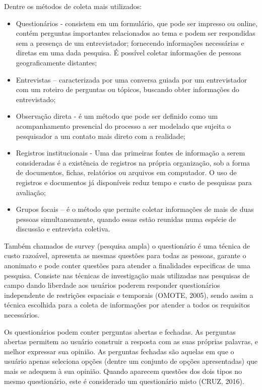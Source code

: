\documentclass[
	12pt,				%
    oneside,			%
	a4paper,			%
	english,			%
	french,				%
	spanish,			%
	brazil,				%
	]{abntex2}
\begin{document}
Dentre os métodos de coleta mais utilizados:
\begin{itemize}
	\item Questionários - consistem em um formulário, que pode ser impresso ou online, contém perguntas importantes relacionados ao tema e podem ser respondidas sem a presença de um entrevistador; fornecendo informações necessárias e diretas em uma dada pesquisa. É possível coletar informações de pessoas geograficamente distantes;
	
	\item Entrevistas – caracterizada por uma conversa guiada por um entrevistador com um roteiro de perguntas ou tópicos, buscando obter informações do entrevistado;
	
	\item Observação direta - é um método que pode ser definido como um acompanhamento presencial do processo a ser modelado que sujeita o pesquisador a um contato mais direto com a realidade;
	
	\item Registros institucionais - Uma das primeiras fontes de informação a serem consideradas é a existência de registros na própria organização, sob a forma de documentos, fichas, relatórios ou arquivos em computador. O uso de registros e documentos já disponíveis reduz tempo e custo de pesquisas para avaliação;
	
	\item Grupos focais – é o método que permite coletar informações de mais de duas pessoas simultaneamente, quando essas estão reunidas numa espécie de discussão e entrevista coletiva.
	
\end{itemize}

Também chamados de survey (pesquisa ampla) o questionário é uma técnica de custo razoável, apresenta as mesmas questões para todas as pessoas, garante o anonimato e pode conter questões para atender a finalidades especificas de uma pesquisa. Consiste  nas técnicas de investigação mais utilizadas nas pesquisas de campo dando liberdade aos usuários poderem responder questionários independente de restrições espaciais e temporais (OMOTE, 2005), sendo assim a técnica escolhida para a coleta de informações por atender a todos os requisitos necessários.

Os questionários podem conter perguntas abertas e fechadas. As perguntas abertas permitem ao usuário construir a resposta com as suas próprias palavras, e melhor expressar sua opinião. As perguntas fechadas são aquelas em que o usuário apenas seleciona opções (dentre um conjunto de opções apresentadas) que mais se adequem à sua opinião. Quando aparecem questões dos dois tipos no mesmo questionário, este é considerado um questionário misto (CRUZ, 2016).
\end{document}
